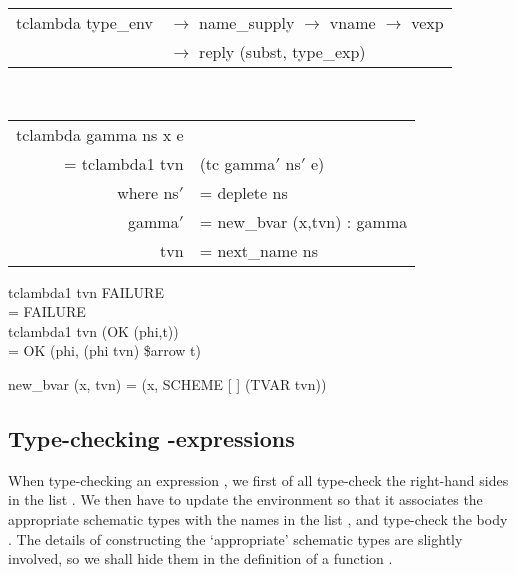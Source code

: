 \begin{mlcoded}
    \begin{tabular}{l@{\hspace{8pt}}l}
        tclambda \hastype{} type\_env &$\rightarrow$ name\_supply $\rightarrow$ vname $\rightarrow$ vexp \\
        &$\rightarrow$ reply (subst, type\_exp)
    \end{tabular} \\
    \begin{tabular}{r@{\hspace{8pt}}l}
        tclambda gamma ns x e& \\
        = tclambda1 tvn &(tc gamma$'$ ns$'$ e) \\
        where ns$'$ &= deplete ns \\
        gamma$'$ &= new\_bvar (x,tvn)\; :\; gamma \\
        tvn \hspace{.6cm} &= next\_name ns
    \end{tabular}
\end{mlcoded}

\begin{mlcoded}
    tclambda1 tvn FAILURE \\
    \hspace*{1.5cm} = FAILURE \\
    tclambda1 tvn (OK (phi,t)) \\
    \hspace*{1.5cm} = OK (phi, (phi tvn) \$arrow t)
\end{mlcoded}

\begin{mlcoded}
    new\_bvar (x, tvn) = (x, SCHEME [ ] (TVAR tvn))
\end{mlcoded}

\subsection{Type-checking -expressions}

When type-checking an expression , we first of all type-check
the right-hand sides in the list . We then have to update the environment so
that it associates the appropriate schematic types with the names in the list ,
and type-check the body . The details of constructing the `appropriate'
schematic types are slightly involved, so we shall hide them in the definition of
a function .

